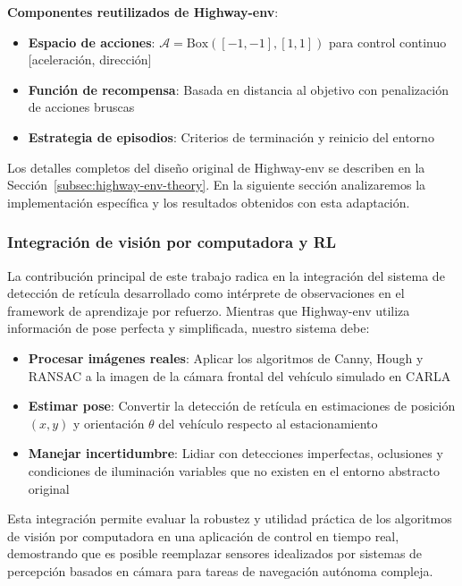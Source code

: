 \noindent
\textbf{Componentes reutilizados de Highway-env}:
\begin{itemize}
    \item \textbf{Espacio de acciones}: $\mathcal{A} = \text{Box}([-1, -1], [1, 1])$ para control continuo [aceleración, dirección]
    \item \textbf{Función de recompensa}: Basada en distancia al objetivo con penalización de acciones bruscas
    \item \textbf{Estrategia de episodios}: Criterios de terminación y reinicio del entorno
\end{itemize}

\noindent
Los detalles completos del diseño original de Highway-env se describen en la
Sección~\ref{subsec:highway-env-theory}. En la siguiente sección analizaremos
la implementación específica y los resultados obtenidos con esta adaptación.

\subsubsection{Integración de visión por computadora y RL}\label{subsec:rl-integration}
\noindent
La contribución principal de este trabajo radica en la integración del sistema de
detección de retícula desarrollado como intérprete de observaciones en el framework
de aprendizaje por refuerzo. Mientras que Highway-env utiliza información de pose
perfecta y simplificada, nuestro sistema debe:

\begin{itemize}
    \item \textbf{Procesar imágenes reales}: Aplicar los algoritmos de Canny, Hough y RANSAC
    a la imagen de la cámara frontal del vehículo simulado en CARLA
    \item \textbf{Estimar pose}: Convertir la detección de retícula en estimaciones de
    posición $(x,y)$ y orientación $\theta$ del vehículo respecto al estacionamiento
    \item \textbf{Manejar incertidumbre}: Lidiar con detecciones imperfectas, oclusiones
    y condiciones de iluminación variables que no existen en el entorno abstracto original
\end{itemize}

\noindent
Esta integración permite evaluar la robustez y utilidad práctica de los algoritmos
de visión por computadora en una aplicación de control en tiempo real, demostrando
que es posible reemplazar sensores idealizados por sistemas de percepción basados
en cámara para tareas de navegación autónoma compleja.

